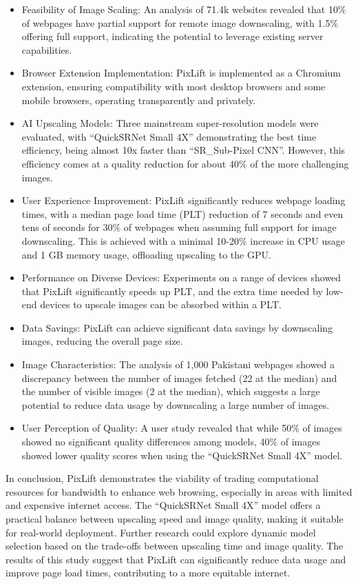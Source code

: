\documentclass[acmsmall]{acmart}
\newcommand{\tool}{{PixLift}\xspace}
\begin{document}
\begin{itemize}
    \item Feasibility of Image Scaling: An analysis of 71.4k websites revealed that 10\% of webpages have partial support for remote image downscaling, with 1.5\% offering full support, indicating the potential to leverage existing server capabilities.
    \item Browser Extension Implementation: \tool is implemented as a Chromium extension, ensuring compatibility with most desktop browsers and some mobile browsers, operating transparently and privately.
    \item AI Upscaling Models: Three mainstream super-resolution models were evaluated, with ``QuickSRNet Small 4X'' demonstrating the best time efficiency, being almost 10x faster than ``SR\_Sub-Pixel CNN''. However, this efficiency comes at a quality reduction for about 40\% of the more challenging images.
    \item User Experience Improvement: \tool significantly reduces webpage loading times, with a median page load time (PLT) reduction of 7 seconds and even tens of seconds for 30\% of webpages when assuming full support for image downscaling. This is achieved with a minimal 10-20\% increase in CPU usage and 1 GB memory usage, offloading upscaling to the GPU.
    \item Performance on Diverse Devices: Experiments on a range of devices showed that \tool significantly speeds up PLT, and the extra time needed by low-end devices to upscale images can be absorbed within a PLT.
    \item Data Savings: \tool can achieve significant data savings by downscaling images, reducing the overall page size.
    \item Image Characteristics: The analysis of 1,000 Pakistani webpages showed a discrepancy between the number of images fetched (22 at the median) and the number of visible images (2 at the median), which suggests a large potential to reduce data usage by downscaling a large number of images.
    \item User Perception of Quality: A user study revealed that while 50\% of images showed no significant quality differences among models, 40\% of images showed lower quality scores when using the ``QuickSRNet Small 4X'' model.
\end{itemize}

In conclusion, \tool demonstrates the viability of trading computational resources for bandwidth to enhance web browsing, especially in areas with limited and expensive internet access. The ``QuickSRNet Small 4X'' model offers a practical balance between upscaling speed and image quality, making it suitable for real-world deployment. Further research could explore dynamic model selection based on the trade-offs between upscaling time and image quality. The results of this study suggest that \tool can significantly reduce data usage and improve page load times, contributing to a more equitable internet.



\end{document}
